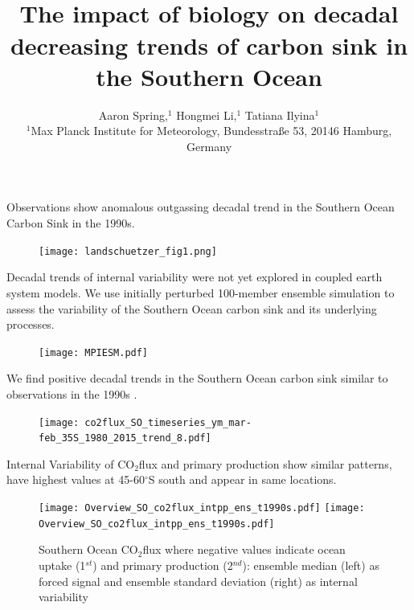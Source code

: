 \documentclass[aspectratio=169]{beamer}
\title{\vspace{1cm} \\ The impact of biology on decadal decreasing trends of carbon sink in the Southern Ocean}
\subtitle{ \vspace{1cm} Aaron Spring,$^{1}$ Hongmei Li,$^{1}$ Tatiana Ilyina$^{1}$
\\ \normalsize{$^{1}$Max Planck Institute for Meteorology, Bundesstra{\ss}e 53, 20146 Hamburg, Germany}
}
\begin{document}
\begin{frame}[noframenumbering]
	\titlepage
\end{frame}

\begin{frame}{Observations \citep{landschuetzer2015} show anomalous outgassing decadal trend in the Southern Ocean Carbon Sink in the 1990s.}
	\begin{figure}[h]
	\centering
	\texttt{[image: landschuetzer\_fig1.png]} %
	\label{fig:SOCS_ensmean_ensstd}
	\end{figure}
	
\end{frame}
	
	
\begin{frame}{Decadal trends of internal variability were not yet explored in coupled earth system models. We use initially perturbed 100-member ensemble simulation to assess the variability of the Southern Ocean carbon sink and its underlying processes.}

	\begin{figure}
		\centering
		\texttt{[image: MPIESM.pdf]}
	\end{figure}
\end{frame}



\begin{frame}{We find positive decadal trends in the Southern Ocean carbon sink similar to observations in the 1990s \citep{landschuetzer2015}.} 
	
	\begin{figure}
		\centering
		\texttt{[image: co2flux\_SO\_timeseries\_ym\_mar-feb\_35S\_1980\_2015\_trend\_8.pdf]}
	\end{figure}
\end{frame}	
	
\begin{frame}{Internal Variability of CO$_2$flux and primary production show similar patterns, have highest values at 45-60$^\circ$S south and appear in same locations.}  
	
	\begin{figure}
		\centering
		\texttt{[image: Overview\_SO\_co2flux\_intpp\_ens\_t1990s.pdf]} %
		\texttt{[image: Overview\_SO\_co2flux\_intpp\_ens\_t1990s.pdf]} %
	\caption{Southern Ocean CO$_2$flux where negative values indicate ocean uptake (1$^{st}$) and primary production (2$^{nd}$): ensemble median (left) as forced signal and ensemble standard deviation (right) as internal variability \citep{Deser2012}}
		\label{fig:SOCS_ensmean_ensstd}
	\end{figure}
\end{frame}	
	
\end{document}
